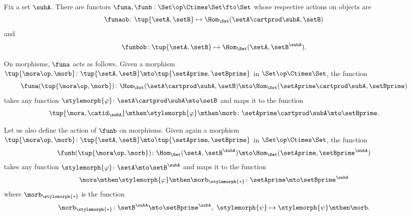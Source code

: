 \begin{gradedexercise}
    \label{ex:NaturalCurry}
    Fix a set $\subA$.
    There are functors $\funa, \funb: \Set\op \Ctimes \Set \fto \Set$ whose respective actions on objects are
    \begin{equation}
        \funaob \colon \tup{\setA, \setB} \mapsto \Hom_\Set(\setA \cartprod \subA, \setB)
    \end{equation}
    and
    \begin{equation}
        \funbob \colon \tup{\setA, \setB} \mapsto \Hom_\Set(\setA, \setB^\subA).
    \end{equation}

    On morphisms, $\funa$ acts as follows.
    Given a morphism $\tup{\mora\op, \morb} \colon \tup{\setA, \setB} \mto \tup{\setAprime, \setBprime}$ in $\Set\op \Ctimes \Set$, the function
    $$\funa(\tup{\mora\op, \morb}) \colon \Hom_\Set(\setA \cartprod \subA, \setB) \mto \Hom_\Set(\setAprime \cartprod \subA, \setBprime)$$
    takes any function $\stylemorph{\varphi} \colon \setA \cartprod \subA \mto \setB$ and maps it to the function
    \begin{equation}
        \tup{\mora, \catid_{\subA}} \mthen \stylemorph{\varphi} \mthen \morb \colon \setAprime \cartprod \subA \mto \setBprime.
    \end{equation}

    Let us also define the action of $\funb$ on morphisms.
    Given again a morphism $\tup{\mora\op, \morb} \colon \tup{\setA, \setB} \mto \tup{\setAprime, \setBprime}$ in $\Set\op \Ctimes \Set$, the function
    $$\funb(\tup{\mora\op, \morb}) \colon \Hom_\Set(\setA, \setB^\subA) \mto \Hom_\Set(\setAprime, \setBprime^\subA)$$
    takes any function $\stylemorph{\varphi} \colon \setA \mto \setB^\subA$ and maps it to the function
    \begin{equation}
        \mora \mthen \stylemorph{\varphi} \mthen \morb_{\stylemorph{*}} \colon \setAprime \mto \setBprime^\subA
    \end{equation}
    where $\morb_{\stylemorph{*}}$ is the function
    \begin{equation}
        \morb_{\stylemorph{*}} \colon \setB^\subA \mto \setBprime^\subA, \ \stylemorph{\psi} \mapsto \stylemorph{\psi} \mthen \morb.
    \end{equation}



\end{gradedexercise}
